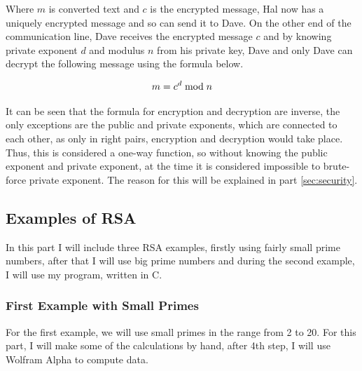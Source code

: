 \documentclass[a4paper, 12pt]{article}
\begin{document}
Where $m$ is converted text and $c$ is the encrypted message, Hal now has a uniquely encrypted
message and so can send it to Dave. On the other end of the communication line, Dave receives
the encrypted message $c$ and by knowing private exponent $d$ and modulus $n$ from his private key,
Dave and only Dave can decrypt the following message using the formula below.

\begin{equation*}
  m = c^d \bmod n\\
\end{equation*}

It can be seen that the formula for encryption and decryption are inverse, the only exceptions are
the public and private exponents, which are connected to each other, as only in right pairs,
encryption and decryption would take place. Thus, this is considered a one-way function, so
without knowing the public exponent and private exponent, at the time it is considered impossible
to brute-force private exponent. The reason for this will be explained in part \ref{sec:security}.

\subsection{Examples of RSA}
\label{bsec:example}

In this part I will include three RSA examples, firstly using fairly small prime numbers, after that
I will use big prime numbers and during the second example, I will use my program, written in C.

\subsubsection{First Example with Small Primes}
\label{bbsec:first}

For the first example, we will use small primes in the range from 2 to 20. For this part, I will make
some of the calculations by hand, after 4th step, I will use Wolfram Alpha to compute data.
\end{document}
